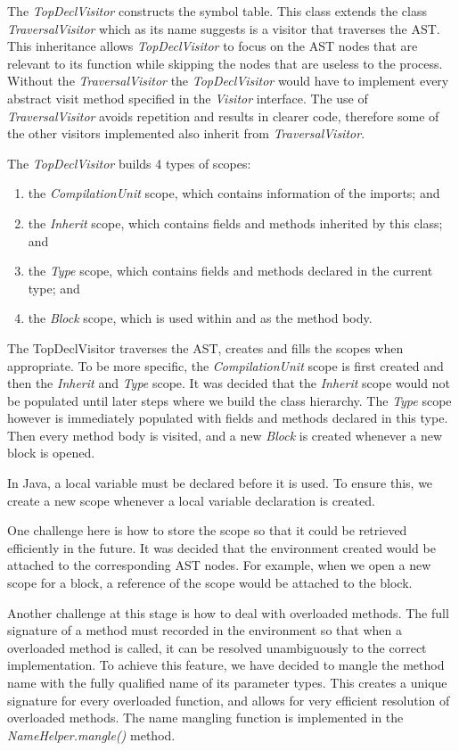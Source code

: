 \documentclass[a4paper, notitlepage]{report}
\begin{document}
The \emph{TopDeclVisitor} constructs the symbol table. This class extends the class \emph{TraversalVisitor} which as its name suggests is a visitor that traverses the AST. This inheritance allows \emph{TopDeclVisitor} to focus on the AST nodes that are relevant to its function while skipping the nodes that are useless to the process. Without the \emph{TraversalVisitor} the \emph{TopDeclVisitor} would have to implement every abstract visit method specified in the \emph{Visitor} interface. The use of \emph{TraversalVisitor} avoids repetition and results in clearer code, therefore some of the other visitors implemented also inherit from \emph{TraversalVisitor}.

The \emph{TopDeclVisitor} builds 4 types of scopes: 
\begin{enumerate}
\item the \emph{CompilationUnit} scope, which contains information of the imports; and
\item the \emph{Inherit} scope, which contains fields and methods inherited by this class; and
\item the \emph{Type} scope, which contains fields and methods declared in the current type; and
\item the \emph{Block} scope, which is used within and as the method body.

\end{enumerate}

The TopDeclVisitor traverses the AST, creates and fills the scopes when appropriate. To be more specific, the \emph{CompilationUnit} scope is first created and then the \emph{Inherit} and \emph{Type} scope. It was decided that the \emph{Inherit} scope would not be populated until later steps where we build the class hierarchy. The \emph{Type} scope however is immediately populated with fields and methods declared in this type. Then every method body is visited, and a new \emph{Block} is created whenever a new block is opened. 

In Java, a local variable must be declared before it is used. To ensure this, we create a new scope whenever a local variable declaration is created.

One challenge here is how to store the scope so that it could be retrieved efficiently in the future. It was decided that the environment created would be attached to the corresponding AST nodes. For example, when we open a new scope for a block, a reference of the scope would be attached to the block.

Another challenge at this stage is how to deal with overloaded methods. The full signature of a method must recorded in the environment so that when a overloaded method is called, it can be resolved unambiguously to the correct implementation. To achieve this feature, we have decided to mangle the method name with the fully qualified name of its parameter types. This creates a unique signature for every overloaded function, and allows for very efficient resolution of overloaded methods. The name mangling function is implemented in the \emph{NameHelper.mangle()} method. 
\end{document}
